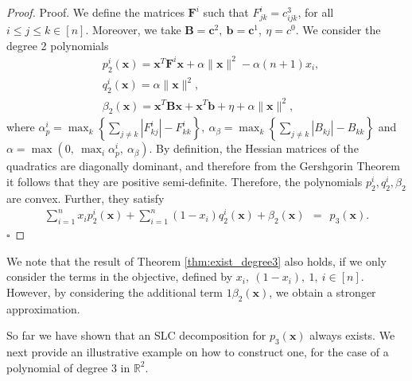 \documentclass[opre,nonblindrev]{informs3} %
\begin{document}
\begin{proof}{Proof. }
{\color{black} We define the matrices $\boldsymbol{F}^i$ such that  $F_{jk}^i = c_{ijk}^3$, for all $i \le j \le k \in [n]$. Moreover, we take $\boldsymbol{B} = \boldsymbol{c}^2, \: \boldsymbol{b} = \boldsymbol{c}^1, \: \eta = c^0$. We consider the degree 2 polynomials 
\begin{align*}
    & p_2^i(\boldsymbol{x}) = \boldsymbol{x}^T \boldsymbol{F}^i \boldsymbol{x} + \alpha \|\boldsymbol{x}\|^2 - \alpha (n+1) x_i, \\ 
    & q_2^i(\boldsymbol{x}) = \alpha \|\boldsymbol{x}\|^2, \\ 
    & \beta_2(\boldsymbol{x}) = \boldsymbol{x}^T \boldsymbol{B} \boldsymbol{x} + \boldsymbol{x}^T \boldsymbol{b} + \eta + \alpha \|\boldsymbol{x}\|^2,
\end{align*}   
where $\alpha_p^i = \max_k \left\{ \sum_{j \neq k} |F_{kj}^i| - F_{kk}^i \right\}, \: \alpha_{\beta} = \max_k \left\{ \sum_{j \neq k} |B_{kj}| - B_{kk} \right\}$ and $\alpha = \max \left(0, \: \max_i \alpha_p^i, \: \alpha_{\beta} \right)$. By definition, the Hessian matrices of the quadratics are diagonally dominant, and therefore from the Gershgorin Theorem \cite{gershgorin1931uber} it follows that they are positive semi-definite. Therefore, the polynomials $p_2^i, q_2^i, \beta_2$ are convex.} Further, they satisfy
\begin{align*}
    \sum_{i=1}^n x_ip_2^i(\boldsymbol{x}) + \sum_{i=1}^n(1-x_i)q_2^i(\boldsymbol{x}) + \beta_2(\boldsymbol{x})  
    \: \: = \: \: p_3(\boldsymbol{x}).
\end{align*}  \hfill $\square$
\end{proof}     

\begin{remark}
We note that the result of Theorem \ref{thm:exist_degree3} also holds, if we only consider the terms in the objective, defined by $x_i, \: (1-x_i),\: 1, \: i \in [n]$. However, by considering the additional term $1 \beta_2(\boldsymbol{x})$, we obtain a stronger approximation.
\end{remark}

So far we have shown that an SLC decomposition for $p_3(\boldsymbol{x})$ always exists. We next provide an illustrative example on how to construct one, for the case of a polynomial of degree 3 in $\mathbb{R}^2$. 
\end{document}
